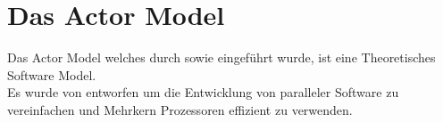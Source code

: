 \chapter{Das Actor Model}
Das Actor Model welches durch \cite{hewitt1973session} sowie \cite{Agha1985ActorsSystems} eingeführt wurde, ist eine Theoretisches Software Model. 
\citet{hewitt1973session} \\
\cit
Es wurde von \cite{hewitt1973session} entworfen um die Entwicklung von paralleler Software zu vereinfachen und Mehrkern Prozessoren effizient zu verwenden.